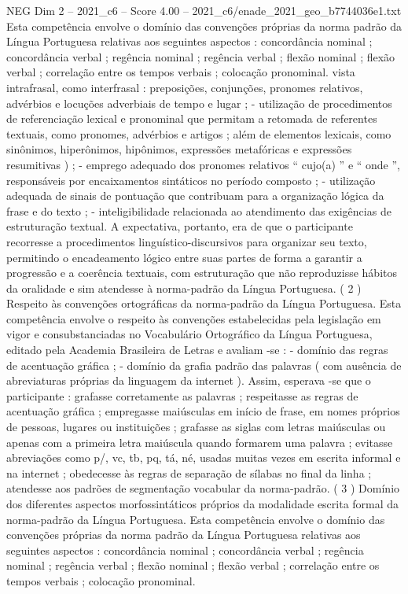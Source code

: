 \begin{textsample}{NEG Dim 2 – 2021\_c6 – Score 4.00 – 2021\_c6/enade\_2021\_geo\_b7744036e1.txt}
Esta competência envolve o domínio das convenções próprias da norma padrão da Língua Portuguesa relativas aos seguintes aspectos : concordância nominal ; concordância verbal ; regência nominal ; regência verbal ; flexão nominal ; flexão verbal ; correlação entre os tempos verbais ; colocação pronominal. vista intrafrasal, como interfrasal : preposições, conjunções, pronomes relativos, advérbios e locuções adverbiais de tempo e lugar ; - utilização de procedimentos de referenciação lexical e pronominal que permitam a retomada de referentes textuais, como pronomes, advérbios e artigos ; além de elementos lexicais, como sinônimos, hiperônimos, hipônimos, expressões metafóricas e expressões resumitivas ) ; - emprego adequado dos pronomes relativos “ cujo(a) ” e “ onde ”, responsáveis por encaixamentos sintáticos no período composto ; - utilização adequada de sinais de pontuação que contribuam para a organização lógica da frase e do texto ; - inteligibilidade relacionada ao atendimento das exigências de estruturação textual.
A expectativa, portanto, era de que o participante recorresse a procedimentos linguístico-discursivos para organizar seu texto, permitindo o encadeamento lógico entre suas partes de forma a garantir a progressão e a coerência textuais, com estruturação que não reproduzisse hábitos da oralidade e sim atendesse à norma-padrão da Língua Portuguesa. ( 2 ) Respeito às convenções ortográficas da norma-padrão da Língua Portuguesa.
Esta competência envolve o respeito às convenções estabelecidas pela legislação em vigor e consubstanciadas no Vocabulário Ortográfico da Língua Portuguesa, editado pela Academia Brasileira de Letras e avaliam -se : - domínio das regras de acentuação gráfica ; - domínio da grafia padrão das palavras ( com ausência de abreviaturas próprias da linguagem da internet ).
Assim, esperava -se que o participante : grafasse corretamente as palavras ; respeitasse as regras de acentuação gráfica ; empregasse maiúsculas em início de frase, em nomes próprios de pessoas, lugares ou instituições ; grafasse as siglas com letras maiúsculas ou apenas com a primeira letra maiúscula quando formarem uma palavra ; evitasse abreviações como p/, vc, tb, pq, tá, né, usadas muitas vezes em escrita informal e na internet ; obedecesse às regras de separação de sílabas no final da linha ; atendesse aos padrões de segmentação vocabular da norma-padrão. ( 3 ) Domínio dos diferentes aspectos morfossintáticos próprios da modalidade escrita formal da norma-padrão da Língua Portuguesa.
Esta competência envolve o domínio das convenções próprias da norma padrão da Língua Portuguesa relativas aos seguintes aspectos : concordância nominal ; concordância verbal ; regência nominal ; regência verbal ; flexão nominal ; flexão verbal ; correlação entre os tempos verbais ; colocação pronominal.

\end{textsample}
